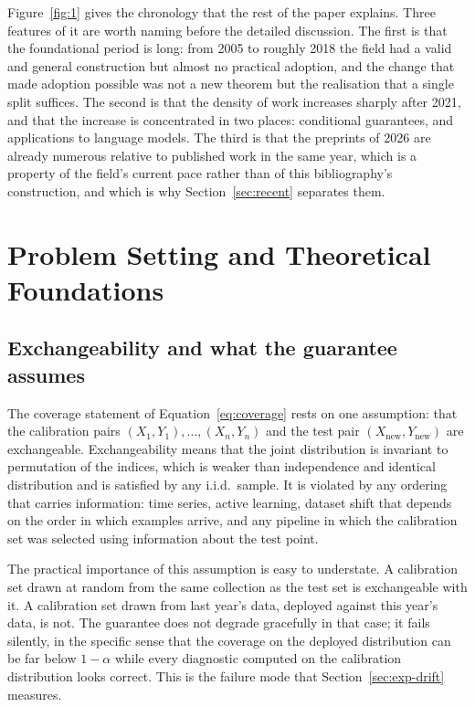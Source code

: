 \documentclass[a4paper,longmktitle]{cas-sc}
\begin{document}
Figure~\ref{fig:1} gives the chronology that the rest of the paper explains. Three features of it are worth naming before the detailed discussion. The first is that the foundational period is long: from 2005 to roughly 2018 the field had a valid and general construction but almost no practical adoption, and the change that made adoption possible was not a new theorem but the realisation that a single split suffices. The second is that the density of work increases sharply after 2021, and that the increase is concentrated in two places: conditional guarantees, and applications to language models. The third is that the preprints of 2026 are already numerous relative to published work in the same year, which is a property of the field's current pace rather than of this bibliography's construction, and which is why Section~\ref{sec:recent} separates them.

\section{Problem Setting and Theoretical Foundations}

\subsection{Exchangeability and what the guarantee assumes}

The coverage statement of Equation~\ref{eq:coverage} rests on one assumption: that the calibration pairs $(X_1,Y_1),\dots,(X_n,Y_n)$ and the test pair $(X_{\text{new}},Y_{\text{new}})$ are exchangeable. Exchangeability means that the joint distribution is invariant to permutation of the indices, which is weaker than independence and identical distribution and is satisfied by any i.i.d.\ sample. It is violated by any ordering that carries information: time series, active learning, dataset shift that depends on the order in which examples arrive, and any pipeline in which the calibration set was selected using information about the test point.

The practical importance of this assumption is easy to understate. A calibration set drawn at random from the same collection as the test set is exchangeable with it. A calibration set drawn from last year's data, deployed against this year's data, is not. The guarantee does not degrade gracefully in that case; it fails silently, in the specific sense that the coverage on the deployed distribution can be far below $1-\alpha$ while every diagnostic computed on the calibration distribution looks correct. This is the failure mode that Section~\ref{sec:exp-drift} measures.
\end{document}
